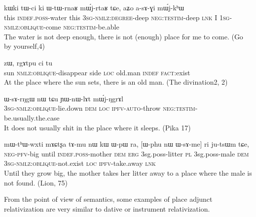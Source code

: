 \documentclass[oldfontcommands,oneside,a4paper,11pt]{article}
\newcommand{\ipa}[1]{{\phon #1}} %
\newcommand{\topic}{\textsc{dem}}
\begin{document}
\begin{exe}
   \ex \label{ex:asAGi}
 \gll
\ipa{kɯki}   	\ipa{tɯ-ci}   	\ipa{ki}   	\ipa{ɯ-tɯ-rnaʁ}   	\ipa{mɯ́j-rtaʁ}   	\ipa{tɕe,}   	\ipa{aʑo}   	\ipa{a-sɤ-ɣi}   	\ipa{mɯ́j-kʰɯ}   \\
this \textsc{indef.poss}-water this \textsc{3sg-nmlz:degree}-deep \textsc{neg:testim}-deep \textsc{lnk} I \textsc{1sg-nmlz:oblique}-come \textsc{neg:testim}-be.able \\
\glt The water is not deep enough, there is not (enough) place for me to come. (Go by yourself,4)
\end{exe}


\begin{exe}
   \ex \label{ex:tANe}
 \gll [\ipa{tɤŋe}   	\ipa{sɤ-ɕqhlɤt}]   	\ipa{pɕoʁ}   	\ipa{zɯ,}   	\ipa{rgɤtpu}   	\ipa{ci}   	\ipa{tu}   \\
sun \textsc{nmlz:oblique}-disappear side \textsc{loc} old.man \textsc{indef} \textsc{fact}:exist \\
\glt At the place where the sun sets, there is an old man. (The divination2, 2)
\end{exe}
\begin{exe}
   \ex \label{ex:WsArNgW}
 \gll
\ipa{ɯ-sɤ-rŋgɯ}   	\ipa{nɯ} \ipa{tɕu}   	\ipa{ɲɯ-nɯ-lɤt}   	\ipa{mɯ́j-ŋgrɤl}   \\
\textsc{3sg-nmlz:oblique}-lie.down \textsc{dem} \textsc{loc} \textsc{ipfv-auto}-throw \textsc{neg:testim}-be.usually.the.case \\
\glt  It  does not usually shit in the place where it sleeps. (Pika 17)
\end{exe}

\begin{exe}
   \ex \label{ex:WsAme}
 \gll
\ipa{mɯ-tʰɯ-wxti}   	\ipa{mɤɕtʂa}   	\ipa{tɤ-mu}   	\ipa{nɯ}   	\ipa{kɯ}   	\ipa{ɯ-pɯ}   	\ipa{ra,}   	[\ipa{ɯ-phu}   	\ipa{nɯ}   	\ipa{ɯ-sɤ-me}]   	\ipa{ri}   	\ipa{ju-tsɯm}   	\ipa{tɕe,}   \\
\textsc{neg-pfv}-big until \textsc{indef.poss}-mother \topic{} \textsc{erg}  {3sg.poss}-litter \textsc{pl}  {3sg.poss}-male \topic{} \textsc{3sg-nmlz:oblique}-not.exist  \textsc{loc} \textsc{ipfv}-take.away \textsc{lnk} \\
\glt  Until they grow big, the mother takes her litter away to a place where the male is not found. (Lion, 75)
  \end{exe}
From the point of view of semantics, some examples of place adjunct relativization are very similar to dative or instrument relativization. 
\end{document}

